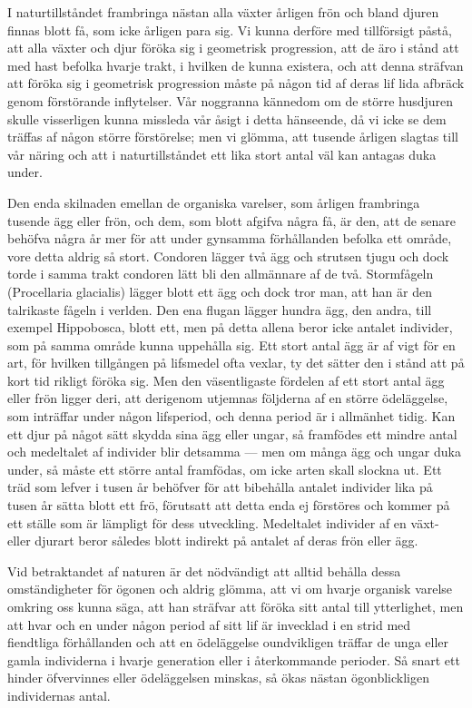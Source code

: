 I naturtillståndet frambringa nästan alla växter årligen frön och bland djuren finnas blott få, som icke årligen para sig. Vi kunna derföre med tillförsigt påstå, att alla växter och djur föröka sig i geometrisk progression, att de äro i stånd att med hast befolka hvarje trakt, i hvilken de kunna existera, och att denna sträfvan att föröka sig i geometrisk progression måste på någon tid af deras lif lida afbräck genom förstörande inflytelser. Vår noggranna kännedom om de större husdjuren skulle visserligen kunna missleda vår åsigt i detta hänseende, då vi icke se dem träffas af någon större förstörelse; men vi glömma, att tusende årligen slagtas till vår näring och att i naturtillståndet ett lika stort antal väl kan antagas duka under.

Den enda skilnaden emellan de organiska varelser, som årligen frambringa tusende ägg eller frön, och dem, som blott afgifva några få, är den, att de senare behöfva några år mer för att under gynsamma förhållanden befolka ett område, vore detta aldrig så stort. Condoren lägger två ägg och strutsen tjugu och dock torde i samma trakt condoren lätt bli den allmännare af de två. Stormfågeln (Procellaria glacialis) lägger blott ett ägg och dock tror man, att han är den talrikaste fågeln i verlden. Den ena flugan lägger hundra ägg, den andra, till exempel Hippobosca, blott ett, men på detta allena beror icke antalet individer, som på samma område kunna uppehålla sig. Ett stort antal ägg är af vigt för en art, för hvilken tillgången på lifsmedel ofta vexlar, ty det sätter den i stånd att på kort tid rikligt föröka sig. Men den väsentligaste fördelen af ett stort antal ägg eller frön ligger deri, att derigenom utjemnas följderna af en större ödeläggelse, som inträffar under någon lifsperiod, och denna period är i allmänhet tidig. Kan ett djur på något sätt skydda sina ägg eller ungar, så framfödes ett mindre antal och medeltalet af individer blir detsamma — men om många ägg och ungar duka under, så måste ett större antal framfödas, om icke arten skall slockna ut. Ett träd som lefver i tusen år behöfver för att bibehålla antalet individer lika på tusen år sätta blott ett frö, förutsatt att detta enda ej förstöres och kommer på ett ställe som är lämpligt för dess utveckling. Medeltalet individer af en växt- eller djurart beror således blott indirekt på antalet af deras frön eller ägg.

Vid betraktandet af naturen är det nödvändigt att alltid behålla dessa omständigheter för ögonen och aldrig glömma, att vi om hvarje organisk varelse omkring oss kunna säga, att han sträfvar att föröka sitt antal till ytterlighet, men att hvar och en under någon period af sitt lif är invecklad i en strid med fiendtliga förhållanden och att en ödeläggelse oundvikligen träffar de unga eller gamla individerna i hvarje generation eller i återkommande perioder. Så snart ett hinder öfvervinnes eller ödeläggelsen minskas, så ökas nästan ögonblickligen individernas antal.



